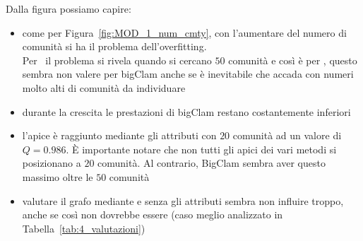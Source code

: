 Dalla figura possiamo capire:
\begin{itemize}
	\item come per Figura~\ref{fig:MOD_1_num_cmty}, con l'aumentare del numero di comunità si ha il problema dell'overfitting.\\
	Per \citeseer\ il problema si rivela quando si cercano $50$ comunità e così è per \cora, questo sembra non valere per bigClam anche se è inevitabile che accada con numeri molto alti di comunità da individuare
	\item durante la crescita le prestazioni di bigClam restano costantemente inferiori
	\item l'apice è raggiunto mediante gli attributi con $20$ comunità ad un valore di $Q=0.986$. È importante notare che non tutti gli apici dei vari metodi si posizionano a $20$ comunità. Al contrario, BigClam sembra aver questo massimo oltre le $50$ comunità
	\item valutare il grafo mediante e senza gli attributi sembra non influire troppo, anche se così non dovrebbe essere (caso meglio analizzato in Tabella~\ref{tab:4_valutazioni})
\end{itemize}
%
